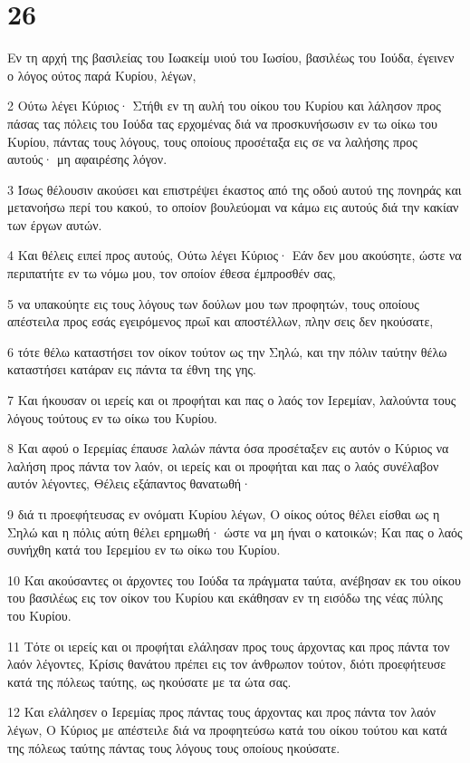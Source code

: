 \chapter{26}

\par Εν τη αρχή της βασιλείας του Ιωακείμ υιού του Ιωσίου, βασιλέως του Ιούδα, έγεινεν ο λόγος ούτος παρά Κυρίου, λέγων,
\par 2 Ούτω λέγει Κύριος· Στήθι εν τη αυλή του οίκου του Κυρίου και λάλησον προς πάσας τας πόλεις του Ιούδα τας ερχομένας διά να προσκυνήσωσιν εν τω οίκω του Κυρίου, πάντας τους λόγους, τους οποίους προσέταξα εις σε να λαλήσης προς αυτούς· μη αφαιρέσης λόγον.
\par 3 Ίσως θέλουσιν ακούσει και επιστρέψει έκαστος από της οδού αυτού της πονηράς και μετανοήσω περί του κακού, το οποίον βουλεύομαι να κάμω εις αυτούς διά την κακίαν των έργων αυτών.
\par 4 Και θέλεις ειπεί προς αυτούς, Ούτω λέγει Κύριος· Εάν δεν μου ακούσητε, ώστε να περιπατήτε εν τω νόμω μου, τον οποίον έθεσα έμπροσθέν σας,
\par 5 να υπακούητε εις τους λόγους των δούλων μου των προφητών, τους οποίους απέστειλα προς εσάς εγειρόμενος πρωΐ και αποστέλλων, πλην σεις δεν ηκούσατε,
\par 6 τότε θέλω καταστήσει τον οίκον τούτον ως την Σηλώ, και την πόλιν ταύτην θέλω καταστήσει κατάραν εις πάντα τα έθνη της γης.
\par 7 Και ήκουσαν οι ιερείς και οι προφήται και πας ο λαός τον Ιερεμίαν, λαλούντα τους λόγους τούτους εν τω οίκω του Κυρίου.
\par 8 Και αφού ο Ιερεμίας έπαυσε λαλών πάντα όσα προσέταξεν εις αυτόν ο Κύριος να λαλήση προς πάντα τον λαόν, οι ιερείς και οι προφήται και πας ο λαός συνέλαβον αυτόν λέγοντες, Θέλεις εξάπαντος θανατωθή·
\par 9 διά τι προεφήτευσας εν ονόματι Κυρίου λέγων, Ο οίκος ούτος θέλει είσθαι ως η Σηλώ και η πόλις αύτη θέλει ερημωθή· ώστε να μη ήναι ο κατοικών; Και πας ο λαός συνήχθη κατά του Ιερεμίου εν τω οίκω του Κυρίου.
\par 10 Και ακούσαντες οι άρχοντες του Ιούδα τα πράγματα ταύτα, ανέβησαν εκ του οίκου του βασιλέως εις τον οίκον του Κυρίου και εκάθησαν εν τη εισόδω της νέας πύλης του Κυρίου.
\par 11 Τότε οι ιερείς και οι προφήται ελάλησαν προς τους άρχοντας και προς πάντα τον λαόν λέγοντες, Κρίσις θανάτου πρέπει εις τον άνθρωπον τούτον, διότι προεφήτευσε κατά της πόλεως ταύτης, ως ηκούσατε με τα ώτα σας.
\par 12 Και ελάλησεν ο Ιερεμίας προς πάντας τους άρχοντας και προς πάντα τον λαόν λέγων, Ο Κύριος με απέστειλε διά να προφητεύσω κατά του οίκου τούτου και κατά της πόλεως ταύτης πάντας τους λόγους τους οποίους ηκούσατε.
